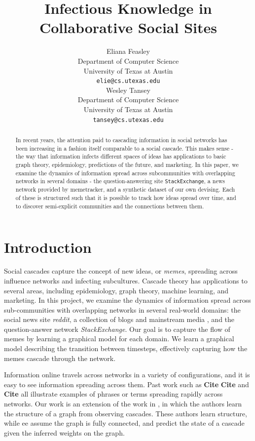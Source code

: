 \documentclass{article} %
\title{Infectious Knowledge in Collaborative Social Sites}
\author{
Eliana Feasley\\
Department of Computer Science\\
University of Texas at Austin\\
\texttt{elie@cs.utexas.edu} \\
\And
Wesley Tansey\\
Department of Computer Science\\
University of Texas at Austin\\
\texttt{tansey@cs.utexas.edu} \\
}
\def\c{\textbf{ Cite }}
\begin{document}
\maketitle

\begin{abstract}
In recent years, the attention paid to cascading information in social networks has been increasing in a fashion itself comparable to a social cascade. This makes sense - the way that information infects different spaces of ideas has applications to basic graph theory, epidemiology, predictions of the future, and marketing. In this paper, we examine the dynamics of information spread across subcommunities with overlapping networks in several domains - the question-answering site \texttt{StackExchange}, a news network provided by memetracker, and a synthetic dataset of our own devising. Each of these is structured such that it is possible to track how ideas spread over time, and to discover semi-explicit communities and the connections between them.
\end{abstract}

\section{Introduction}
\label{intro}
Social cascades capture the concept of new ideas, or \textit{memes}, spreading across influence networks and infecting subcultures. Cascade theory has applications to several areas, including epidemiology, graph theory, machine learning, and marketing. In this project, we examine the dynamics of information spread across sub-communities with overlapping networks in several real-world domains: the social news site \textit{reddit}, a collection of blogs and mainstream media \cite{memetracker}, and the question-answer network \textit{StackExchange}. Our goal is to capture the flow of memes by learning a graphical model for each domain. We learn a graphical model describing the transition between timesteps, effectively capturing how the memes cascade through the network.

Information online travels across networks in a variety of configurations, and it is easy to see information spreading across them. Past work such as \c \c and \c all illustrate examples of phrases or terms spreading rapidly across networks.
Our work is an extension of the work in \cite{netinf}, in which the authors learn the structure of a graph from observing cascades. These authors learn structure, while ee assume the graph is fully connected, and predict the state of a cascade given the inferred weights on the graph. 
\end{document}

